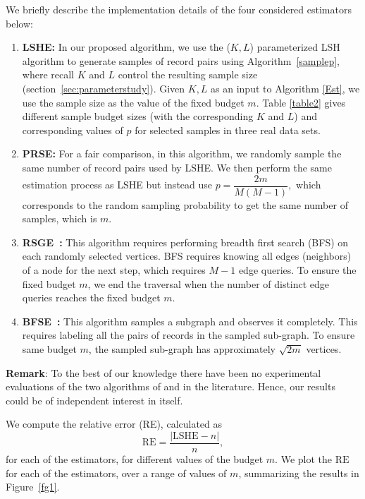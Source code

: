 \documentclass[aoas]{imsart}
\begin{document}
We briefly describe the implementation details of the four considered estimators below:
\begin{enumerate}
\item \textbf{LSHE:} In our proposed algorithm, we use the ($K, L$) parameterized LSH algorithm to generate samples of record pairs using Algorithm~\ref{samplep}, where recall $K$ and $L$ control the resulting sample size (section~\ref{sec:parameterstudy}). Given $K, L$ as an input to Algorithm \ref{Est}, we use the sample size as the value of the fixed budget $m$. Table \ref{table2} gives different sample budget sizes (with the corresponding $K$ and $L$) and corresponding values of $p$ for selected samples in three real data sets.
\item \textbf{PRSE:} For a fair comparison, in this algorithm, we randomly sample the same number of record pairs used by LSHE. We then perform the same estimation process as LSHE but instead use $p = \dfrac{2m}{M(M-1)},$ which corresponds to the random sampling probability to get the same number of samples, which is $m$.
\item \textbf{RSGE~\citep{1978paper}:} This algorithm requires performing breadth first search (BFS) on each randomly selected vertices. BFS requires knowing all edges (neighbors) of a node for the next step, which requires $M-1$ edge queries. To ensure the fixed budget $m$, we end the traversal when the number of distinct edge queries reaches the fixed budget $m$.

\item \textbf{BFSE~\citep{chazelle2005approximating}:} This algorithm samples a subgraph and observes it completely. This requires labeling all the pairs of records in the sampled sub-graph. To ensure same budget $m$, the sampled sub-graph has approximately $\sqrt{2m}$ vertices.
\end{enumerate}

\textbf{Remark}: To the best of our knowledge there have been no experimental evaluations of the two algorithms of \cite{1978paper} and \cite{chazelle2005approximating} in the literature. Hence, our results could be of independent interest in itself.

We compute the relative error (RE), calculated as $$\text{RE} = \dfrac{|\text{LSHE} - n|}{n},$$ for each of the estimators, for different values of the budget $m$. We plot the $\text{RE}$ for each of the estimators, over a range of values of $m$, summarizing the results in Figure~\ref{fg1}.
\end{document}
